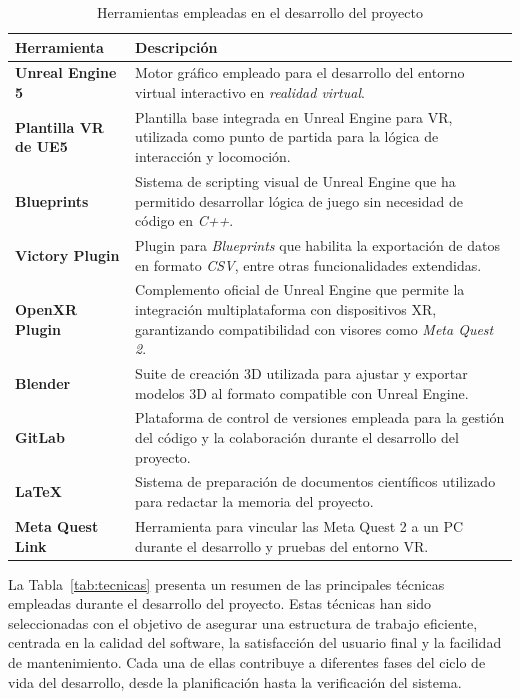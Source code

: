 \begin{table}[p]
    \centering
    \caption{Herramientas empleadas en el desarrollo del proyecto}
    \label{tab:herramientas}
    \begin{tabular}{|p{4.5cm}|p{9.5cm}|}
        \hline
        \textbf{Herramienta} & \textbf{Descripción} \\
        \hline
        \textbf{Unreal Engine 5} & Motor gráfico empleado para el desarrollo del entorno virtual interactivo en \textit{realidad virtual}. \\
        \hline
        \textbf{Plantilla VR de UE5} & Plantilla base integrada en Unreal Engine para VR, utilizada como punto de partida para la lógica de interacción y locomoción. \\
        \hline
        \textbf{Blueprints} & Sistema de scripting visual de Unreal Engine que ha permitido desarrollar lógica de juego sin necesidad de código en \textit{C++}. \\
        \hline
        \textbf{Victory Plugin} & Plugin para \textit{Blueprints} que habilita la exportación de datos en formato \textit{CSV}, entre otras funcionalidades extendidas. \\
        \hline
        \textbf{OpenXR Plugin} & Complemento oficial de Unreal Engine que permite la integración multiplataforma con dispositivos XR, garantizando compatibilidad con visores como \textit{Meta Quest 2}. \\
        \hline
        \textbf{Blender} & Suite de creación 3D utilizada para ajustar y exportar modelos 3D al formato compatible con Unreal Engine. \\
        \hline
        \textbf{GitLab} & Plataforma de control de versiones empleada para la gestión del código y la colaboración durante el desarrollo del proyecto. \\
        \hline
        \textbf{LaTeX} & Sistema de preparación de documentos científicos utilizado para redactar la memoria del proyecto. \\
        \hline
        \textbf{Meta Quest Link} & Herramienta para vincular las Meta Quest 2 a un PC durante el desarrollo y pruebas del entorno VR. \\
        \hline
    \end{tabular}
\end{table}

La Tabla~\ref{tab:tecnicas} presenta un resumen de las principales técnicas empleadas durante el desarrollo del proyecto. Estas técnicas han sido seleccionadas con el objetivo de asegurar una estructura de trabajo eficiente, centrada en la calidad del software, la satisfacción del usuario final y la facilidad de mantenimiento. Cada una de ellas contribuye a diferentes fases del ciclo de vida del desarrollo, desde la planificación hasta la verificación del sistema.

